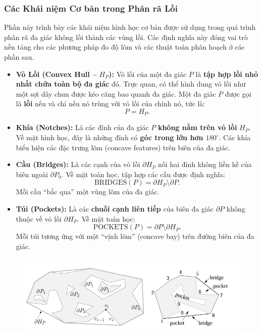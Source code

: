 \documentclass{article}
\begin{document}
\subsubsection{Các Khái niệm Cơ bản trong Phân rã Lồi}
\label{sec:basic-concepts}

Phần này trình bày các khái niệm hình học cơ bản được sử dụng trong quá trình phân rã đa giác không lồi thành các vùng lồi. 
Các định nghĩa này đóng vai trò nền tảng cho các phương pháp đo độ lõm và các thuật toán phân hoạch ở các phần sau.

\begin{itemize}
    \item \textbf{Vỏ Lồi (Convex Hull – $H_P$):}  
    Vỏ lồi của một đa giác $P$ là \textbf{tập hợp lồi nhỏ nhất chứa toàn bộ đa giác} đó.  
    Trực quan, có thể hình dung vỏ lồi như một sợi dây chun được kéo căng bao quanh đa giác.  
    Một đa giác $P$ được gọi là \textbf{lồi} nếu và chỉ nếu nó trùng với vỏ lồi của chính nó, tức là:
    \[
    P = H_P.
    \]

    \item \textbf{Khía (Notches):}  
    Là các đỉnh của đa giác $P$ \textbf{không nằm trên vỏ lồi} $H_P$.  
    Về mặt hình học, đây là những đỉnh có \textbf{góc trong lớn hơn $180^\circ$}.  
    Các khía biểu hiện các đặc trưng lõm (concave features) trên biên của đa giác.

    \item \textbf{Cầu (Bridges):}  
    Là các cạnh của vỏ lồi $\partial H_P$ nối hai đỉnh không liền kề của biên ngoài $\partial P_0$.  
    Về mặt toán học, tập hợp các cầu được định nghĩa:
    \[
    \text{BRIDGES}(P) = \partial H_P \setminus \partial P.
    \]
    Mỗi cầu “bắc qua” một vùng lõm của đa giác.

    \item \textbf{Túi (Pockets):}  
    Là các \textbf{chuỗi cạnh liên tiếp} của biên đa giác $\partial P$ không thuộc về vỏ lồi $\partial H_P$.  
    Về mặt toán học:
    \[
    \text{POCKETS}(P) = \partial P \setminus \partial H_P.
    \]
    Mỗi túi tương ứng với một “vịnh lõm” (concave bay) trên đường biên của đa giác.
\end{itemize}

\begin{figure}[H]
    \centering
    \includegraphics[width=0.7\linewidth]{imgs/ACD-5.png}
\end{figure}
\end{document}
